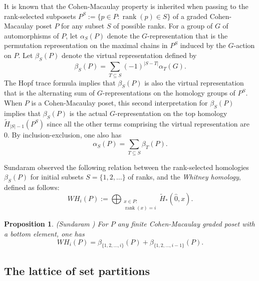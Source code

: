 \documentclass[12pt]{amsart}
\theoremstyle{plain}
\newtheorem{prop}[thm]{Proposition}
\theoremstyle{definition}
\begin{document}
It is known that the Cohen-Macaulay property is inherited when
passing to the rank-selected subposets 
$P^S:=\{ p \in P: {{\operatorname{rank}}}(p) \in S\}$ of a graded Cohen-Macaulay poset $P$ for any subset $S$ of possible ranks.
For a group of $G$ of automorphisms of $P$, let $\alpha_S(P)$  denote
the $G$-representation that is the permutation representation  
on the maximal chains in $P^S$ induced by the $G$-action on $P$.  Let 
$\beta_S(P)$ denote the virtual representation defined by 
\begin{equation} 
\label{beta-definition}
\beta_S(P)  = \sum_{T\subseteq S} (-1)^{|S-T|} \alpha_T(G).
\end{equation}
The Hopf trace formula implies  that $\beta_S(P)$ is also the virtual representation that is the alternating 
sum of $G$-representations on the homology groups of $P^S$.  When $P$ is 
a Cohen-Macaulay
poset, this second interpretation for  $\beta_S(P)$ implies that $\beta_S(P)$ is the actual 
$G$-representation on 
the top homology $\tilde{H}_{|S|-1}(P^S)$ since all the other terms comprising the 
virtual representation are 0.
By inclusion-exclusion, one also has
\begin{equation}
\label{alpha-as-sum-of-betas}
\alpha_S(P)= \sum_{T \subseteq S} \beta_T(P).
\end{equation}

\noindent
Sundaram observed the following
relation between the rank-selected homologies $\beta_S(P)$ 
for initial subsets $S=\{1,2,\ldots\}$ of ranks, 
and the {\it Whitney homology}, defined as follows:
$$
WH_i(P):= \bigoplus_{\substack{x \in P :\\ {{\operatorname{rank}}}(x)=i}} \tilde{H}_*(\hat{0},x).
$$

\begin{prop}(Sundaram \cite[Prop. 1.9]{Sundaram})
\label{rank-selected-from-Whitney}
For $P$ any finite Cohen-Macaulay graded poset with a bottom element,
one has 
$$
WH_i(P) = \beta_{\{1,2,\ldots,i\}}(P) + \beta_{\{1,2,\ldots,i-1\}}(P).
$$
\end{prop}

\subsection{The lattice of set partitions}
\label{set-partition-review-subsection}
\end{document}
